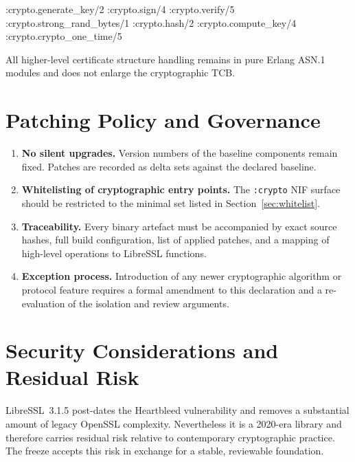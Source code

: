 \documentclass{article}
\let\originalfootnotesize\footnotesize
\let\oldverbatim\verbatim
\let\oldendverbatim\endverbatim
\renewenvironment{verbatim}{\originalfootnotesize\oldverbatim}{\oldendverbatim}
\begin{document}
\begin{verbatim}
:crypto.generate_key/2
:crypto.sign/4
:crypto.verify/5
:crypto.strong_rand_bytes/1
:crypto.hash/2
:crypto.compute_key/4          % only if CA.AES / ECDH retained
:crypto.crypto_one_time/5      % only if AES support retained
\end{verbatim}

All higher-level certificate structure handling remains in pure Erlang ASN.1 modules
and does not enlarge the cryptographic TCB.

\section{Patching Policy and Governance}
\label{sec:policy}

\begin{enumerate}
  \item \textbf{No silent upgrades.} Version numbers of the baseline components remain fixed.
        Patches are recorded as delta sets against the declared baseline.

  \item \textbf{Whitelisting of cryptographic entry points.} The \texttt{:crypto} NIF surface
        should be restricted to the minimal set listed in Section~\ref{sec:whitelist}.

  \item \textbf{Traceability.} Every binary artefact must be accompanied by exact source hashes,
        full build configuration, list of applied patches, and a mapping of high-level operations
        to LibreSSL functions.

  \item \textbf{Exception process.} Introduction of any newer cryptographic algorithm or protocol
        feature requires a formal amendment to this declaration and a re-evaluation of the isolation
        and review arguments.
\end{enumerate}

\section{Security Considerations and Residual Risk}
\label{sec:risk}

LibreSSL~3.1.5 post-dates the Heartbleed vulnerability and removes a substantial amount of
legacy OpenSSL complexity. Nevertheless it is a 2020-era library and therefore carries residual
risk relative to contemporary cryptographic practice. The freeze accepts this risk in exchange
for a stable, reviewable foundation.
\end{document}
